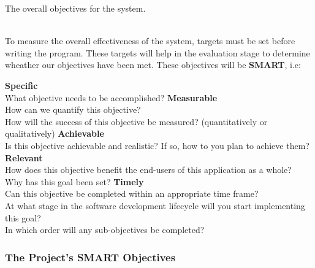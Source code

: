 \documentclass[../../../main.tex]{subfiles}
\begin{document}
\noindent The overall objectives for the system.

\noindent \\ To measure the overall effectiveness of the system, targets must be set before writing the program.
These targets will help in the evaluation stage to determine wheather our objectives have been met.
These objectives will be \textbf{SMART}, i.e:

\begin{outline}
  \1 \textbf{Specific}\\
  What objective needs to be accomplished?
  \1 \textbf{Measurable}\\
  How can we quantify this objective?\\
  How will the success of this objective be measured? (quantitatively or qualitatively)
  \1 \textbf{Achievable}\\
  Is this objective achievable and realistic? If so, how to you plan to achieve them?
  \1 \textbf{Relevant}\\
  How does this objective benefit the end-users of this application as a whole?\\
  Why has this goal been set?
  \1 \textbf{Timely}\\
  Can this objective be completed within an appropriate time frame?\\
  At what stage in the software development lifecycle will you start implementing this goal?\\
  In which order will any sub-objectives be completed?
\end{outline}

\subsubsection{The Project's SMART Objectives}
\end{document}
